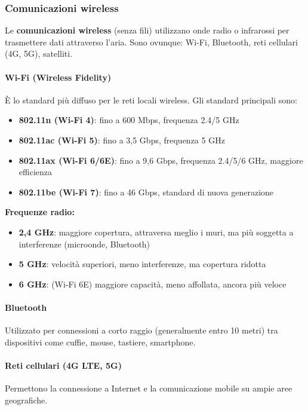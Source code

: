\documentclass[12pt,a4paper]{article}
\begin{document}
\subsubsection{Comunicazioni wireless}

Le \textbf{comunicazioni wireless} (senza fili) utilizzano onde radio o infrarossi per trasmettere dati attraverso l'aria. Sono ovunque: Wi-Fi, Bluetooth, reti cellulari (4G, 5G), satelliti.

\paragraph{Wi-Fi (Wireless Fidelity)}
È lo standard più diffuso per le reti locali wireless. Gli standard principali sono:

\begin{itemize}
    \item \textbf{802.11n (Wi-Fi 4)}: fino a 600 Mbps, frequenza 2.4/5 GHz
    \item \textbf{802.11ac (Wi-Fi 5)}: fino a 3,5 Gbps, frequenza 5 GHz
    \item \textbf{802.11ax (Wi-Fi 6/6E)}: fino a 9,6 Gbps, frequenza 2.4/5/6 GHz, maggiore efficienza
    \item \textbf{802.11be (Wi-Fi 7)}: fino a 46 Gbps, standard di nuova generazione
\end{itemize}

\textbf{Frequenze radio:}
\begin{itemize}
    \item \textbf{2,4 GHz}: maggiore copertura, attraversa meglio i muri, ma più soggetta a interferenze (microonde, Bluetooth)
    \item \textbf{5 GHz}: velocità superiori, meno interferenze, ma copertura ridotta
    \item \textbf{6 GHz}: (Wi-Fi 6E) maggiore capacità, meno affollata, ancora più veloce
\end{itemize}

\paragraph{Bluetooth}
Utilizzato per connessioni a corto raggio (generalmente entro 10 metri) tra dispositivi come cuffie, mouse, tastiere, smartphone.

\paragraph{Reti cellulari (4G LTE, 5G)}
Permettono la connessione a Internet e la comunicazione mobile su ampie aree geografiche.
\end{document}
